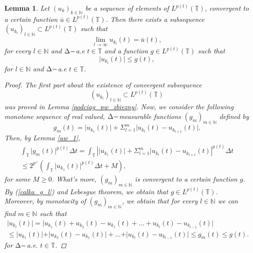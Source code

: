 \documentclass[12pt,a4paper,oneside,titlepage]{article}
\newtheorem{Lemat}{Lemma}
\begin{document}
\begin{Lemat} 
\label{L_p_ogr}
Let $(u_k)_{k \in \mathbb{N}}$ be a sequence of elements of $L^{p(t)}\left( \mathbb{T} \right)$, convergent to a certain function $\overline{u} \in L^{p(t)}\left( \mathbb{T} \right) $. Then there exists a subsequence $\left(  u_{k_l}  \right)_{l \in \mathbb{N}} \subset L^{p(t)}\left( \mathbb{T} \right)$ such that
\begin{equation}
\nonumber
\lim_{l \rightarrow \infty} u_{k_l}(t)=\overline{u}(t),
\end{equation}
for every $l \in \mathbb{N}$ and $\Delta \-- $a.e $t \in \mathbb{T}$ and a function $g \in L^{p(t)}\left( \mathbb{T} \right)  $ such that 
\begin{equation}
\nonumber
\vert u_{k_l}(t) \vert \leq g(t), 
\end{equation}
for $l \in \mathbb{N}$ and $\Delta \-- $a.e $t \in \mathbb{T}$.
\begin{proof}
The first part about the existence of convergent subsequence  
\begin{equation}
\nonumber
\left(  u_{k_l}  \right)_{l \in \mathbb{N}} \subset L^{p(t)}\left( \mathbb{T} \right)
\end{equation}
was proved in Lemma \ref{podciag_pw_zbiezny}. Now, we consider the following monotone sequence of real valued, $\Delta \-- $measurable functions $(g_{m})_{m \in \mathbb{N}}$ defined by
\begin{equation}
\nonumber
g_{m}(t)= \vert u_{k_1}(t) \vert +  \Sigma_{l=1}^{m} \vert u_{k_l}(t) - u_{k_{l+1}}(t) \vert.
\end{equation}
Then, by Lemma \ref{uw_1},
\begin{equation}
\label{calka_g_l}
\begin{split}
\int_{\mathbb{T}} \vert g_{m}(t) \vert^{p(t)} \Delta t = \int_{\mathbb{T}} \left\vert  \vert u_{k_1}(t) \vert +  \Sigma_{l=1}^{m} \vert u_{k_l}(t) - u_{k_{l+1}}(t) \right\vert^{p(t)} \Delta t \\ \leq 2^{p^+} \left( \int_{\mathbb{T}} \vert u_{k_1}(t) \vert^{p(t)} \Delta t + M \right) ,
\end{split}
\end{equation}
for some $M \geq 0$. What's more, $(g_m)_{m \in \mathbb{N}}$ is convergent to a certain function $g$. By (\ref{calka_g_l}) and Lebesgue theorem, we obtain that $g \in L^{p(t)}\left( \mathbb{T} \right)$. Moreover, by monotocity of $(g_m)_{m \in \mathbb{N}}$, we obtain that for every $l \in \mathbb{N}$ we can find $m \in \mathbb{N}$ such that
\begin{equation}
\nonumber
\begin{split}
\vert u_{k_l} (t) \vert = \vert u_{k_1}(t) + u_{k_2}(t) - u_{k_1}(t) + ... + u_{k_l}(t)-u_{k_{l-1}}(t) \vert  \\ \leq    \vert u_{k_1}(t) \vert + \vert  u_{k_2}(t) - u_{k_1}(t)  \vert + ... + \vert u_{k_l}(t)-u_{k_{l-1}}(t) \vert \leq g_{m}(t) \leq g(t) .
\end{split}
\end{equation}
for $\Delta \-- $a.e. $t \in \mathbb{T}$.
\end{proof}
\end{Lemat}
\end{document}
